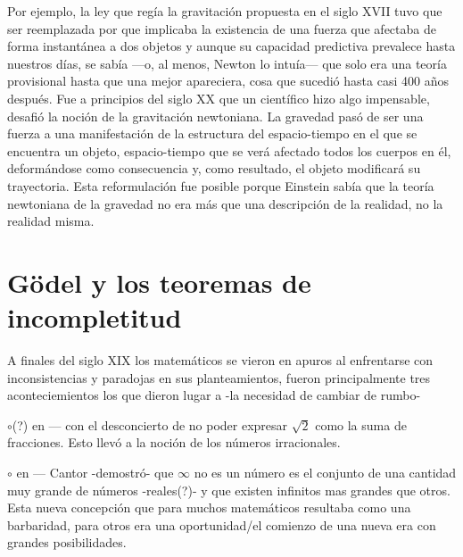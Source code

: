 \documentclass[11pt]{book}
\begin{document}
Por ejemplo, la ley que regía la gravitación propuesta en el siglo XVII tuvo que ser reemplazada por que implicaba la existencia de una fuerza que afectaba de forma instantánea a dos objetos %
y aunque su capacidad predictiva prevalece hasta nuestros días, se sabía ---o, al menos, Newton lo intuía---
que solo era una teoría provisional hasta que una mejor apareciera, cosa que sucedió hasta casi 400 años después. Fue a principios del siglo XX que un científico  hizo algo impensable, desafió la noción de la gravitación newtoniana. La gravedad pasó de ser una fuerza a una manifestación de la estructura del espacio-tiempo en el que se encuentra un objeto, espacio-tiempo que se verá afectado todos los cuerpos en él, deformándose como consecuencia y, como resultado,  el objeto modificará su trayectoria.
Esta reformulación fue posible porque Einstein sabía que la teoría newtoniana de la gravedad no era más que  una descripción de la realidad,  no la realidad misma.

 \section{Gödel y los teoremas de incompletitud }




A finales del siglo XIX los matemáticos se vieron en apuros al enfrentarse con inconsistencias y paradojas en sus planteamientos, fueron principalmente tres aconteciemientos los que dieron lugar a -la necesidad de cambiar de rumbo-

$\circ$(?) en --- con el desconcierto de no poder expresar $\sqrt{2}$ como la suma de fracciones. Esto llevó a la noción de los números irracionales.

$\circ$ en --- Cantor -demostró- que $\infty$ no es un número es el conjunto de una cantidad muy grande de números -reales(?)- y que existen infinitos mas grandes que otros. %
Esta nueva concepción que para muchos matemáticos resultaba como una barbaridad, para otros era una oportunidad/el comienzo de una nueva era con grandes posibilidades. 
\end{document}
